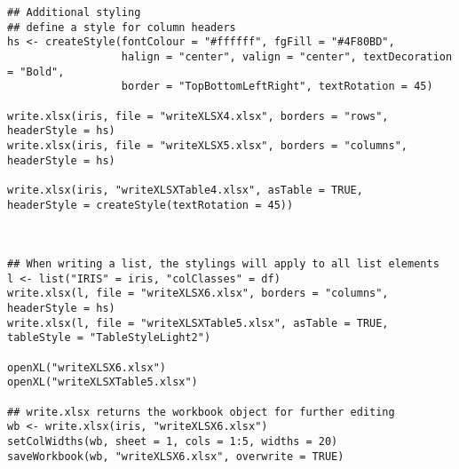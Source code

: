 \documentclass[11pt]{article}\usepackage[]{graphicx}\usepackage[]{color}
\begin{document}
\begin{verbatim}
## Additional styling
## define a style for column headers
hs <- createStyle(fontColour = "#ffffff", fgFill = "#4F80BD",
                  halign = "center", valign = "center", textDecoration = "Bold",
                  border = "TopBottomLeftRight", textRotation = 45)

write.xlsx(iris, file = "writeXLSX4.xlsx", borders = "rows", headerStyle = hs)
write.xlsx(iris, file = "writeXLSX5.xlsx", borders = "columns", headerStyle = hs)

write.xlsx(iris, "writeXLSXTable4.xlsx", asTable = TRUE,
headerStyle = createStyle(textRotation = 45))



## When writing a list, the stylings will apply to all list elements
l <- list("IRIS" = iris, "colClasses" = df)
write.xlsx(l, file = "writeXLSX6.xlsx", borders = "columns", headerStyle = hs)
write.xlsx(l, file = "writeXLSXTable5.xlsx", asTable = TRUE, tableStyle = "TableStyleLight2")

openXL("writeXLSX6.xlsx")
openXL("writeXLSXTable5.xlsx")

## write.xlsx returns the workbook object for further editing
wb <- write.xlsx(iris, "writeXLSX6.xlsx")
setColWidths(wb, sheet = 1, cols = 1:5, widths = 20)
saveWorkbook(wb, "writeXLSX6.xlsx", overwrite = TRUE)

\end{verbatim}


\newpage
\end{document}
